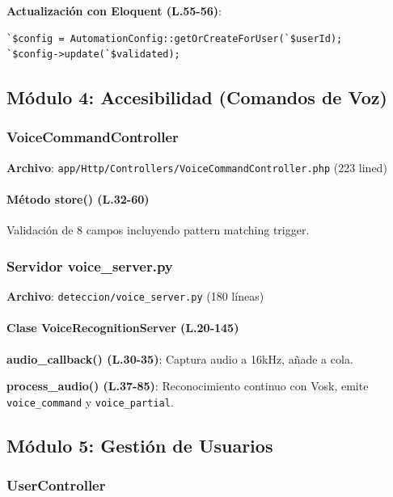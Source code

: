 \textbf{Actualización con Eloquent (L.55-56)}:
\begin{lstlisting}[style=phpstyle]
`$config = AutomationConfig::getOrCreateForUser(`$userId);
`$config->update(`$validated);
\end{lstlisting}

\subsection{Módulo 4: Accesibilidad (Comandos de Voz)}

\subsubsection{VoiceCommandController}

\textbf{Archivo}: \texttt{app/Http/Controllers/VoiceCommandController.php} (223 lined)

\paragraph{Método store() (L.32-60)}

Validación de 8 campos incluyendo pattern matching trigger.

\subsubsection{Servidor voice\_server.py}

\textbf{Archivo}: \texttt{deteccion/voice\_server.py} (180 líneas)

\paragraph{Clase VoiceRecognitionServer (L.20-145)}

\textbf{audio\_callback() (L.30-35)}: Captura audio a 16kHz, añade a cola.

\textbf{process\_audio() (L.37-85)}: Reconocimiento continuo con Vosk, emite \texttt{voice\_command} y \texttt{voice\_partial}.

\subsection{Módulo 5: Gestión de Usuarios}

\subsubsection{UserController}

